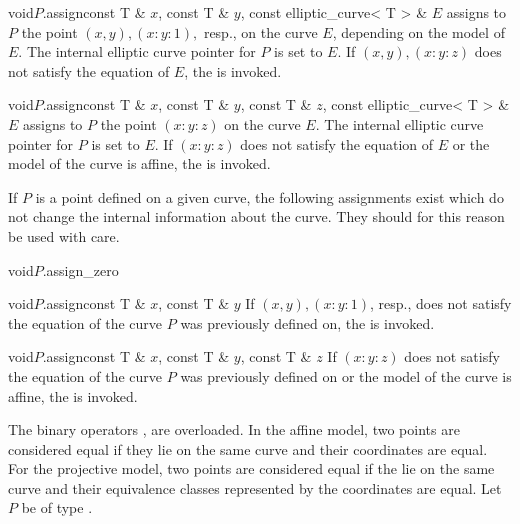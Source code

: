 \begin{fcode}{void}{$P$.assign}{const T & $x$, const T & $y$, 
                    const elliptic_curve< T > & $E$} assigns to $P$
the point $(x, y), (x : y : 1),$ resp., on the curve $E$, depending on
the model of $E$. The internal elliptic curve pointer for $P$ is set
to $E$. If $(x, y), (x:y:z)$ does not satisfy the equation of $E$, the
\LEH is invoked.
\end{fcode}

\begin{fcode}{void}{$P$.assign}{const T & $x$, const T & $y$, const T
& $z$, const elliptic_curve< T > & $E$} assigns to $P$ the point
  $(x:y:z)$ on the curve $E$. The internal elliptic curve pointer for
  $P$ is set to $E$. If $(x:y:z)$ does not satisfy the equation of $E$
  or the model of the curve is affine, the \LEH is invoked.
\end{fcode}

If $P$ is a point defined on a given curve, the following assignments
exist which do not change the internal information about the curve.
They should for this reason be used with care.

\begin{fcode}{void}{$P$.assign_zero}{}
\end{fcode}

\begin{fcode}{void}{$P$.assign}{const T & $x$, const T & $y$}
  If $(x, y), (x : y : 1)$, resp., does not satisfy the equation of
  the curve $P$ was previously defined on, the \LEH is invoked.
\end{fcode}

\begin{fcode}{void}{$P$.assign}{const T & $x$, const T & $y$, const T & $z$}
  If $(x:y:z)$ does not satisfy the equation of the curve $P$ was
  previously defined on or the model of the curve is affine, the \LEH
  is invoked.
\end{fcode}



\COMP

The binary operators \code{==}, \code{!=} are overloaded.  In the
affine model, two points are considered equal if they lie on the same
curve and their coordinates are equal.  For the projective model, two
points are considered equal if the lie on the same curve and their
equivalence classes represented by the coordinates are equal.  Let $P$
be of type .

